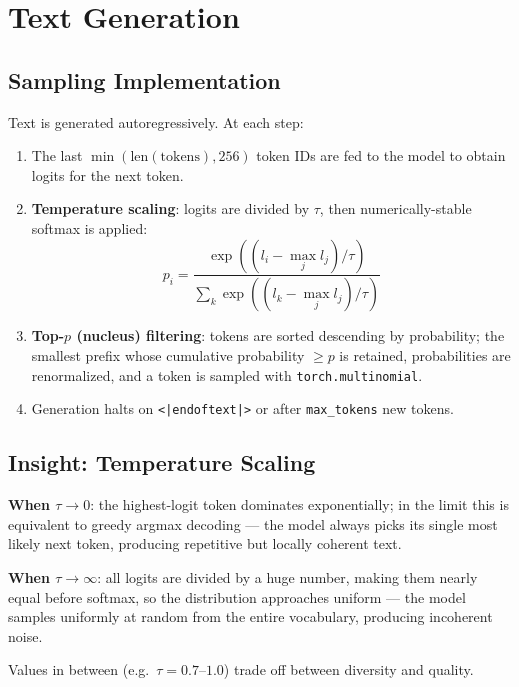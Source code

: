 \documentclass{article}
\begin{document}
\section{Text Generation}

\subsection{Sampling Implementation}

Text is generated autoregressively.  At each step:
\begin{enumerate}
  \item The last $\min(\text{len}(\text{tokens}),256)$ token IDs are fed to
        the model to obtain logits for the next token.
  \item \textbf{Temperature scaling}: logits are divided by $\tau$, then
        numerically-stable softmax is applied:
        \[
          p_i = \frac{\exp((l_i - \max_j l_j)/\tau)}
                     {\sum_k \exp((l_k - \max_j l_j)/\tau)}
        \]
  \item \textbf{Top-$p$ (nucleus) filtering}: tokens are sorted descending by
        probability; the smallest prefix whose cumulative probability $\geq p$
        is retained, probabilities are renormalized, and a token is sampled
        with \texttt{torch.multinomial}.
  \item Generation halts on \texttt{<|endoftext|>} or after
        \texttt{max\_tokens} new tokens.
\end{enumerate}

\subsection{Insight: Temperature Scaling}

\textbf{When $\tau \to 0$}: the highest-logit token dominates
exponentially; in the limit this is equivalent to greedy argmax decoding ---
the model always picks its single most likely next token, producing repetitive
but locally coherent text.

\textbf{When $\tau \to \infty$}: all logits are divided by a huge number,
making them nearly equal before softmax, so the distribution approaches
uniform --- the model samples uniformly at random from the entire vocabulary,
producing incoherent noise.

Values in between (e.g.\ $\tau = 0.7$--$1.0$) trade off between diversity
and quality.
\end{document}
